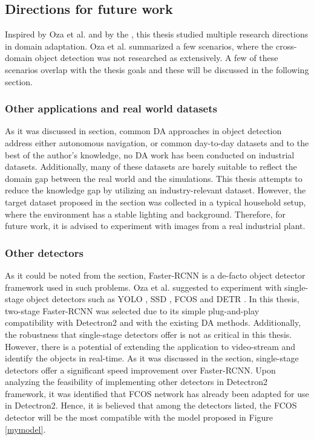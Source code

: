 \subsection{Directions for future work}
Inspired by Oza et al. \cite{Oza2021} and by the , this thesis studied multiple research directions in domain adaptation. Oza et al. summarized a few scenarios, where the cross-domain object detection was not researched as extensively. A few of these scenarios overlap with the thesis goals and these will be discussed in the following section. 

\subsubsection{Other applications and real world datasets}
As it was discussed in  section, common DA approaches in object detection address either autonomous navigation, or common day-to-day datasets and to the best of the author's knowledge, no DA work has been conducted on  industrial datasets. Additionally, many of these datasets are barely suitable to reflect the domain gap between the real world and the simulations. This thesis attempts to reduce the knowledge gap by utilizing an industry-relevant dataset. However, the target dataset proposed in the  section was collected in a typical household setup, where the environment has a stable lighting and background. Therefore, for future work, it is advised to experiment with images from a real industrial plant.  

\subsubsection{Other detectors}
As it could be noted from the  section, Faster-RCNN is a de-facto object detector framework used in such problems. Oza et al. \cite{Oza2021} suggested to experiment with single-stage object detectors such as YOLO \cite{Redmon2015a}, SSD \cite{Liu2015}, FCOS \cite{Tian2019} and DETR \cite{Carion2020}. In this thesis, two-stage Faster-RCNN was selected due to its simple plug-and-play compatibility with Detectron2 \cite{wu2019Detectron2} and with the existing DA methods. Additionally, the robustness that single-stage detectors offer is not as critical in this thesis. However, there is a potential of extending the application to video-stream and identify the objects in real-time. As it was discussed in the  section, single-stage detectors offer a significant speed improvement over Faster-RCNN. Upon analyzing the feasibility of implementing other detectors in Detectron2 \cite{wu2019Detectron2} framework, it was identified that FCOS network has already been adapted for use in Detectron2. Hence, it is believed that among the detectors listed, the FCOS detector will be the most compatible with the model proposed in Figure \ref{mymodel}. 


